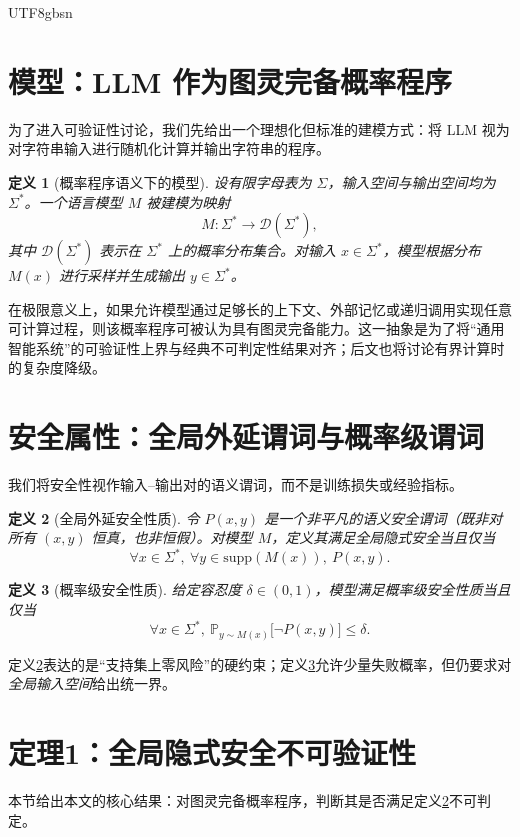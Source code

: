 \documentclass[letterpaper,twocolumn,10pt]{article}
\newtheorem{definition}{定义}
\newcommand{\Prob}{\mathbb{P}}
\newcommand{\Strings}{\Sigma^{*}}
\newcommand{\supp}{\mathrm{supp}}
\begin{document}
\begin{CJK}{UTF8}{gbsn}
\section{模型：LLM 作为图灵完备概率程序}
为了进入可验证性讨论，我们先给出一个理想化但标准的建模方式：将 LLM 视为对字符串输入进行随机化计算并输出字符串的程序。

\begin{definition}[概率程序语义下的模型]\label{def:probprog}
设有限字母表为 $\Sigma$，输入空间与输出空间均为 $\Strings$。一个语言模型 $M$ 被建模为映射
\[
M:\Strings \to \mathcal{D}(\Strings),
\]
其中 $\mathcal{D}(\Strings)$ 表示在 $\Strings$ 上的概率分布集合。对输入 $x\in\Strings$，模型根据分布 $M(x)$ 进行采样并生成输出 $y\in\Strings$。
\end{definition}

在极限意义上，如果允许模型通过足够长的上下文、外部记忆或递归调用实现任意可计算过程，则该概率程序可被认为具有图灵完备能力。这一抽象是为了将“通用智能系统”的可验证性上界与经典不可判定性结果对齐；后文也将讨论有界计算时的复杂度降级。

\section{安全属性：全局外延谓词与概率级谓词}
我们将安全性视作输入--输出对的语义谓词，而不是训练损失或经验指标。

\begin{definition}[全局外延安全性质]\label{def:global}
令 $P(x,y)$ 是一个\emph{非平凡}的语义安全谓词（既非对所有 $(x,y)$ 恒真，也非恒假）。对模型 $M$，定义其满足全局隐式安全当且仅当
\[
\forall x\in\Strings,\ \forall y\in\supp(M(x)),\ P(x,y).
\]
\end{definition}

\begin{definition}[概率级安全性质]\label{def:prob}
给定容忍度 $\delta\in(0,1)$，模型满足概率级安全性质当且仅当
\[
\forall x\in\Strings,\ \Prob_{y\sim M(x)}\big[\neg P(x,y)\big] \le \delta.
\]
\end{definition}

定义\ref{def:global}表达的是“支持集上零风险”的硬约束；定义\ref{def:prob}允许少量失败概率，但仍要求对\emph{全局输入空间}给出统一界。

\section{定理1：全局隐式安全不可验证性}\label{sec:thm1}
本节给出本文的核心结果：对图灵完备概率程序，判断其是否满足定义\ref{def:global}不可判定。


\end{CJK}
\end{document}
